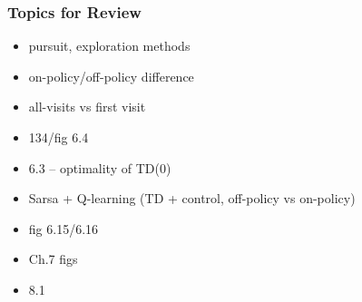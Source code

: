 \subsubsection*{Topics for Review}
\begin{itemize}
\item pursuit, exploration methods
\item on-policy/off-policy difference
\item all-visits vs first visit
\item 134/fig 6.4
\item 6.3 -- optimality of TD(0)
\item Sarsa + Q-learning (TD + control, off-policy vs on-policy)
\item fig 6.15/6.16
\item Ch.7 figs
\item 8.1
\end{itemize}
